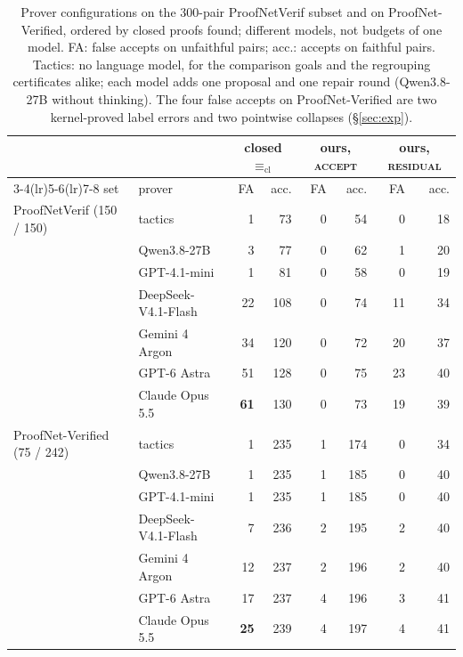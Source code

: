 \documentclass[10pt]{article}
\theoremstyle{definition}
\newcommand{\Ecl}{\mathrel{\equiv_{\mathrm{cl}}}}
\newcommand{\V}[1]{\textsc{#1}}
\begin{document}
\begin{table}[t]
\centering\small
\begin{tabular}{llrrrrrr}
\toprule
& & \multicolumn{2}{c}{closed $\Ecl$} & \multicolumn{2}{c}{ours, \V{accept}} & \multicolumn{2}{c}{ours, \V{residual}}\\
\cmidrule(lr){3-4}\cmidrule(lr){5-6}\cmidrule(lr){7-8}
set & prover & FA & acc. & FA & acc. & FA & acc.\\
\midrule
ProofNetVerif (150 / 150)
  & tactics & 1 & 73 & 0 & 54 & 0 & 18\\
  & Qwen3.8-27B & 3 & 77 & 0 & 62 & 1 & 20\\
  & GPT-4.1-mini & 1 & 81 & 0 & 58 & 0 & 19\\
  & DeepSeek-V4.1-Flash & 22 & 108 & 0 & 74 & 11 & 34\\
  & Gemini 4 Argon & 34 & 120 & 0 & 72 & 20 & 37\\
  & GPT-6 Astra & 51 & 128 & 0 & 75 & 23 & 40\\
  & Claude Opus 5.5 & \textbf{61} & 130 & 0 & 73 & 19 & 39\\
ProofNet-Verified (75 / 242)
  & tactics & 1 & 235 & 1 & 174 & 0 & 34\\
  & Qwen3.8-27B & 1 & 235 & 1 & 185 & 0 & 40\\
  & GPT-4.1-mini & 1 & 235 & 1 & 185 & 0 & 40\\
  & DeepSeek-V4.1-Flash & 7 & 236 & 2 & 195 & 2 & 40\\
  & Gemini 4 Argon & 12 & 237 & 2 & 196 & 2 & 40\\
  & GPT-6 Astra & 17 & 237 & 4 & 196 & 3 & 41\\
  & Claude Opus 5.5 & \textbf{25} & 239 & 4 & 197 & 4 & 41\\
\bottomrule
\end{tabular}
\caption{Prover configurations on the 300-pair ProofNetVerif subset and on ProofNet-Verified, ordered
by closed proofs found; different models, not budgets of one model. FA: false accepts on unfaithful
pairs; acc.: accepts on faithful pairs. Tactics: no language
model, for the comparison goals and the regrouping certificates alike; each model adds one proposal and one repair round (Qwen3.8-27B without thinking). The four
false accepts on ProofNet-Verified are two kernel-proved label errors and two pointwise
collapses (\S\ref{sec:exp}).}
\label{tab:sweep}
\end{table}
\end{document}
